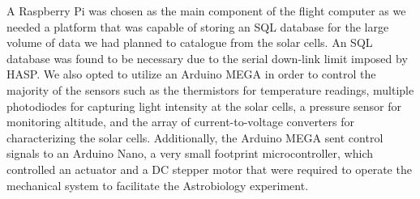 A Raspberry Pi was chosen as the main component of the flight computer as we needed a platform that was capable of storing an SQL database for the large volume of data we had planned to catalogue from the solar cells. An SQL database was found to be necessary due to the serial down-link limit imposed by HASP. We also opted to utilize an Arduino MEGA in order to control the majority of the sensors such as the thermistors for temperature readings, multiple photodiodes for capturing light intensity at the solar cells, a pressure sensor for monitoring altitude, and the array of current-to-voltage converters for characterizing the solar cells. Additionally, the Arduino MEGA sent control signals to an Arduino Nano, a very small footprint microcontroller, which controlled an actuator and a DC stepper motor that were required to operate the mechanical system to facilitate the Astrobiology experiment. 